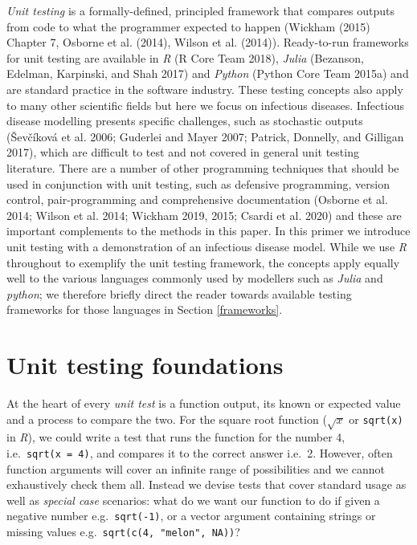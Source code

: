 \documentclass[]{elsarticle} %
\begin{document}
\emph{Unit testing} is a formally-defined, principled framework that compares outputs from code to what the programmer expected to happen (Wickham (2015) Chapter 7, Osborne et al. (2014), Wilson et al. (2014)).
Ready-to-run frameworks for unit testing are available in \emph{R} (R Core Team 2018), \emph{Julia} (Bezanson, Edelman, Karpinski, and Shah 2017) and \emph{Python} (Python Core Team 2015a) and are standard practice in the software industry.
These testing concepts also apply to many other scientific fields but here we focus on infectious diseases.
Infectious disease modelling presents specific challenges, such as stochastic outputs (Ševčíková et al. 2006; Guderlei and Mayer 2007; Patrick, Donnelly, and Gilligan 2017), which are difficult to test and not covered in general unit testing literature.
There are a number of other programming techniques that should be used in conjunction with unit testing, such as defensive programming, version control, pair-programming and comprehensive documentation (Osborne et al. 2014; Wilson et al. 2014; Wickham 2019, 2015; Csardi et al. 2020) and these are important complements to the methods in this paper.
In this primer we introduce unit testing with a demonstration of an infectious disease model.
While we use \emph{R} throughout to exemplify the unit testing framework, the concepts apply equally well to the various languages commonly used by modellers such as \emph{Julia} and \emph{python}; we therefore briefly direct the reader towards available testing frameworks for those languages in Section \ref{frameworks}.

\hypertarget{unit-testing-foundations}{%
\section{Unit testing foundations}\label{unit-testing-foundations}}

At the heart of every \emph{unit test} is a function output, its known or expected value and a process to compare the two.
For the square root function (\(\sqrt{x}\) or \texttt{sqrt(x)} in \emph{R}), we could write a test that runs the function for the number 4, i.e.~\texttt{sqrt(x\ =\ 4)}, and compares it to the correct answer i.e.~2.
However, often function arguments will cover an infinite range of possibilities and we cannot exhaustively check them all.
Instead we devise tests that cover standard usage as well as \emph{special case} scenarios: what do we want our function to do if given a negative number e.g.~\texttt{sqrt(-1)}, or a vector argument containing strings or missing values e.g.~\texttt{sqrt(c(4,\ "melon",\ NA))}?
\end{document}
